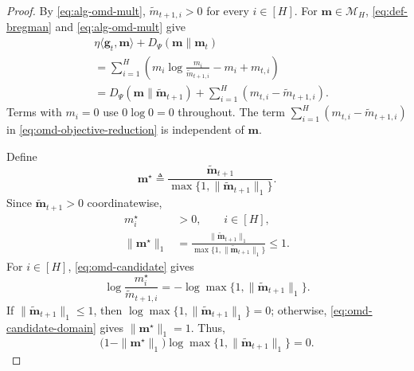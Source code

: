 \documentclass[journal]{IEEEtran}
\theoremstyle{remark}
\begin{document}
\begin{proof}
By \eqref{eq:alg-omd-mult}, $\widetilde{m}_{t+1,i}>0$ for every $i\in[H]$.
For $\mathbf{m}\in\mathcal{M}_H$, \eqref{eq:def-bregman} and
\eqref{eq:alg-omd-mult} give
\begin{equation}
\label{eq:omd-objective-reduction}
\begin{aligned}
&\eta\langle\mathbf{g}_t,\mathbf{m}\rangle+D_\Psi(\mathbf{m}\|\mathbf{m}_t) \\
&=\sum_{i=1}^H\left(
m_i\log\frac{m_i}{\widetilde{m}_{t+1,i}}-m_i+m_{t,i}
\right) \\
&=D_\Psi(\mathbf{m}\|\widetilde{\mathbf{m}}_{t+1})
+\sum_{i=1}^H(m_{t,i}-\widetilde{m}_{t+1,i}).
\end{aligned}
\end{equation}
Terms with $m_i=0$ use $0\log0=0$ throughout.
The term $\sum_{i=1}^H(m_{t,i}-\widetilde{m}_{t+1,i})$ in
\eqref{eq:omd-objective-reduction} is independent of $\mathbf{m}$.

Define
\begin{equation}
\label{eq:omd-candidate}
\mathbf{m}^\star
\triangleq
\frac{\widetilde{\mathbf{m}}_{t+1}}
{\max\{1,\|\widetilde{\mathbf{m}}_{t+1}\|_1\}}.
\end{equation}
Since $\widetilde{\mathbf{m}}_{t+1}>0$ coordinatewise,
\begin{equation}
\label{eq:omd-candidate-domain}
\begin{aligned}
m_i^\star&>0,\qquad i\in[H],\\
\|\mathbf{m}^\star\|_1
&=\frac{\|\widetilde{\mathbf{m}}_{t+1}\|_1}
{\max\{1,\|\widetilde{\mathbf{m}}_{t+1}\|_1\}}
\le1.
\end{aligned}
\end{equation}
For $i\in[H]$, \eqref{eq:omd-candidate} gives
\begin{equation}
\label{eq:omd-candidate-log-ratio}
\log\frac{m_i^\star}{\widetilde{m}_{t+1,i}}
=-\log\max\{1,\|\widetilde{\mathbf{m}}_{t+1}\|_1\}.
\end{equation}
If $\|\widetilde{\mathbf{m}}_{t+1}\|_1\le1$, then
$\log\max\{1,\|\widetilde{\mathbf{m}}_{t+1}\|_1\}=0$; otherwise,
\eqref{eq:omd-candidate-domain} gives $\|\mathbf{m}^\star\|_1=1$. Thus,
\begin{equation}
\label{eq:omd-complementarity}
\bigl(1-\|\mathbf{m}^\star\|_1\bigr)
\log\max\{1,\|\widetilde{\mathbf{m}}_{t+1}\|_1\}=0.
\end{equation}


\end{proof}
\end{document}
